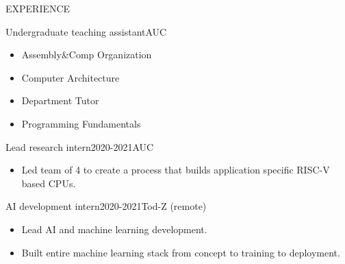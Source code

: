 \documentclass{resume}
\begin{document}
\begin{minipage}[t]{0.44\textwidth}

	\begin{rsection}{\MakeUppercase{experience}}

		\begin{rcontent}{Undergraduate teaching assistant}{}{AUC}
			\begin{itemize}
				\item Assembly\&Comp Organization 
				\item Computer Architecture 
				\item Department Tutor 
				\item Programming Fundamentals 
			\end{itemize}
		\end{rcontent}
		\divider
		\begin{rcontent}{Lead research intern}{2020-2021}{AUC}
			\begin{itemize}
				\item Led team of 4 to create a process that builds application specific RISC-V based CPUs.
			\end{itemize}
		\end{rcontent}
		\divider
		\begin{rcontent}{AI development intern}{2020-2021}{Tod-Z (remote)}
			\begin{itemize}
				\item Lead AI and machine learning development.
				\item Built entire machine learning stack from concept to training to deployment.
			\end{itemize}

\end{rcontent}
\end{rsection}
\end{minipage}
\end{document}
